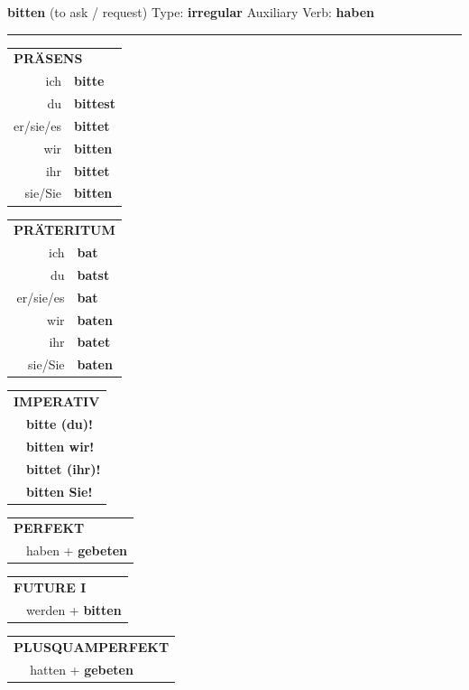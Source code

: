 \documentclass[10pt,a4paper]{revtex4-2}
\begin{document}
\begin{verbbox}
{\Large \bf bitten} (to ask / request) \hfill Type: \textbf{irregular} \hfill Auxiliary Verb: \textbf{haben}

\vspace{5pt}
\hrule
\vspace{5pt}

\begin{tabular}{rl}
\multicolumn{2}{l}{\textbf{PRÄSENS}}\\
ich & \textbf{bitte}\\
du & \textbf{bittest}\\
er/sie/es & \textbf{bittet}\\
wir & \textbf{bitten}\\
ihr & \textbf{bittet}\\
sie/Sie & \textbf{bitten}\\
\end{tabular}
\hfill
\begin{tabular}{rl}
\multicolumn{2}{l}{\textbf{PRÄTERITUM}}\\
ich & \textbf{bat}\\
du & \textbf{batst}\\
er/sie/es & \textbf{bat}\\
wir & \textbf{baten}\\
ihr & \textbf{batet}\\
sie/Sie & \textbf{baten}\\
\end{tabular}
\hfill
\begin{tabular}{rl}
\multicolumn{2}{l}{\textbf{IMPERATIV}}\\
& \textbf{bitte (du)!}\\
& \textbf{bitten wir!}\\
& \textbf{bittet (ihr)!}\\
& \textbf{bitten Sie!}\\
\end{tabular}

\vspace{10pt}

\begin{tabular}{rl}
\multicolumn{2}{l}{\textbf{PERFEKT}}\\
& haben + \textbf{gebeten}\\
\end{tabular}
\hfill
\begin{tabular}{rl}
\multicolumn{2}{l}{\textbf{FUTURE I}}\\
& werden + \textbf{bitten}\\
\end{tabular}
\hfill
\begin{tabular}{rl}
\multicolumn{2}{l}{\textbf{PLUSQUAMPERFEKT}}\\
& hatten + \textbf{gebeten}\\
\end{tabular}


\end{verbbox}
\end{document}
